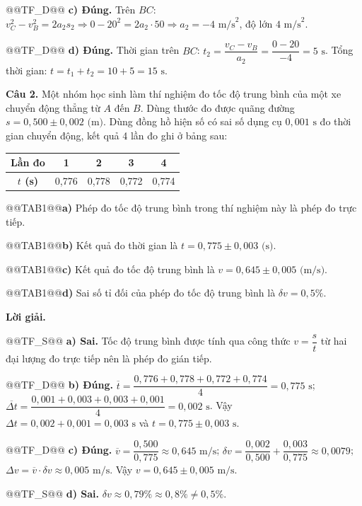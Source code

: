 \documentclass{article}
\begin{document}
@@TF_D@@ \textbf{c) Đúng.} Trên $BC$: $v_C^2 - v_B^2 = 2a_2s_2 \Rightarrow 0 - 20^2 = 2a_2 \cdot 50 \Rightarrow a_2 = -4\text{ m/s}^2$, độ lớn $4\text{ m/s}^2$.

@@TF_D@@ \textbf{d) Đúng.} Thời gian trên $BC$: $t_2 = \dfrac{v_C - v_B}{a_2} = \dfrac{0 - 20}{-4} = 5\text{ s}$. Tổng thời gian: $t = t_1 + t_2 = 10 + 5 = 15\text{ s}$.

\textbf{Câu 2.} Một nhóm học sinh làm thí nghiệm đo tốc độ trung bình của một xe chuyển động thẳng từ $A$ đến $B$. Dùng thước đo được quãng đường $s = 0{,}500 \pm 0{,}002\text{ (m)}$. Dùng đồng hồ hiện số có sai số dụng cụ $0{,}001\text{ s}$ đo thời gian chuyển động, kết quả 4 lần đo ghi ở bảng sau:

\begin{tabular}{|c|c|c|c|c|}\hline \textbf{Lần đo} & \textbf{1} & \textbf{2} & \textbf{3} & \textbf{4} \\ \hline \textbf{$t$ (s)} & 0,776 & 0,778 & 0,772 & 0,774 \\ \hline\end{tabular}

@@TAB1@@\textbf{a)} Phép đo tốc độ trung bình trong thí nghiệm này là phép đo trực tiếp.

@@TAB1@@\textbf{b)} Kết quả đo thời gian là $t = 0{,}775 \pm 0{,}003\text{ (s)}$.

@@TAB1@@\textbf{c)} Kết quả đo tốc độ trung bình là $v = 0{,}645 \pm 0{,}005\text{ (m/s)}$.

@@TAB1@@\textbf{d)} Sai số tỉ đối của phép đo tốc độ trung bình là $\delta v = 0{,}5\%$.

\textbf{Lời giải.}

@@TF_S@@ \textbf{a) Sai.} Tốc độ trung bình được tính qua công thức $v = \dfrac{s}{t}$ từ hai đại lượng đo trực tiếp nên là phép đo gián tiếp.

@@TF_D@@ \textbf{b) Đúng.} $\overline{t} = \dfrac{0{,}776 + 0{,}778 + 0{,}772 + 0{,}774}{4} = 0{,}775\text{ s}$; $\overline{\Delta t} = \dfrac{0{,}001 + 0{,}003 + 0{,}003 + 0{,}001}{4} = 0{,}002\text{ s}$. Vậy $\Delta t = 0{,}002 + 0{,}001 = 0{,}003\text{ s}$ và $t = 0{,}775 \pm 0{,}003\text{ s}$.

@@TF_D@@ \textbf{c) Đúng.} $\overline{v} = \dfrac{0{,}500}{0{,}775} \approx 0{,}645\text{ m/s}$; $\delta v = \dfrac{0{,}002}{0{,}500} + \dfrac{0{,}003}{0{,}775} \approx 0{,}0079$; $\Delta v = \overline{v}\cdot\delta v \approx 0{,}005\text{ m/s}$. Vậy $v = 0{,}645 \pm 0{,}005\text{ m/s}$.

@@TF_S@@ \textbf{d) Sai.} $\delta v \approx 0{,}79\% \approx 0{,}8\% \ne 0{,}5\%$.
\end{document}
